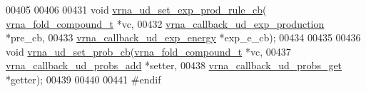 \begin{DoxyCode}
00405 
00406 
00431 \textcolor{keywordtype}{void}  \mbox{\hyperlink{group__domains__up_ga2fb1db2099da26c76247e1209ad4aa09}{vrna\_ud\_set\_exp\_prod\_rule\_cb}}(
      \mbox{\hyperlink{group__fold__compound_structvrna__fc__s}{vrna\_fold\_compound\_t}}             *vc,
00432                                    \mbox{\hyperlink{group__domains__up_ga33d78327dcd04c1ca5ab2887edc18c7b}{vrna\_callback\_ud\_exp\_production}}  *pre\_cb,
00433                                    \mbox{\hyperlink{group__domains__up_ga861706f257ba993753464b823e65b86e}{vrna\_callback\_ud\_exp\_energy}}      *exp\_e\_cb);
00434 
00435 
00436 \textcolor{keywordtype}{void}  \mbox{\hyperlink{unstructured__domains_8h_a13ac877c9db89a1a5b5d9c0394148595}{vrna\_ud\_set\_prob\_cb}}(\mbox{\hyperlink{group__fold__compound_structvrna__fc__s}{vrna\_fold\_compound\_t}}        *vc,
00437                           \mbox{\hyperlink{group__domains__up_gab10498abc84fcaf336aca8f8d7d42eb2}{vrna\_callback\_ud\_probs\_add}}  *setter,
00438                           \mbox{\hyperlink{group__domains__up_gaa10ba1b6f1e179ea84c5caca9cdaae67}{vrna\_callback\_ud\_probs\_get}}  *getter);
00439 
00440 
00441 \textcolor{preprocessor}{#endif}
\end{DoxyCode}
